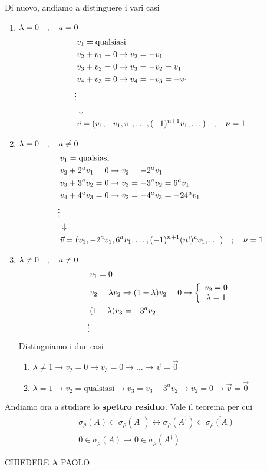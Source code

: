 Di nuovo, andiamo a distinguere i vari casi
\begin{enumerate}
	\item $\lambda = 0 \quad ; \quad a=0$
	\begin{align}
		&v_1 = \text{qualsiasi}\\
		&v_2 + v_1 = 0 \to v_2 = -v_1\\
		&v_3 + v_2 = 0 \to v_3 = -v_2 = v_1\\
		&v_4 + v_3 = 0 \to v_4 = -v_3 = -v_1\\
		\vdots \nonumber \\ &\downarrow \nonumber \\
		&\vec{v} = (v_1, -v_1 , v_1, \dots, (-1)^{n+1}v_1, \dots) \quad ; \quad \nu = 1
	\end{align}
	
	
	
	\item $\lambda = 0 \quad ; \quad a \neq 0$
	\begin{align}
		&v_1 = \text{qualsiasi}\\
		&v_2 + 2^a v_1 = 0 \to v_2 = -2^a v_1 \\
		&v_3 + 3^a v_2 = 0 \to v_3 = -3^a v_2 = 6^a v_1 \\
		&v_4 + 4^a v_3 = 0 \to v_2 = -4^a v_3 = -24^a v_1  \\
		\vdots \nonumber \\ &\downarrow \nonumber \\
		&\vec{v} = (v_1, -2^a v_1 ,6^a v_1, \dots, (-1)^{n+1} (n!)^a v_1, \dots) \quad ; \quad \nu = 1
	\end{align}
	
	
	
	\item $\lambda \neq 0 \quad ; \quad a \neq 0$
	\begin{align}
		&v_1 = 0\\
		&v_2 = \lambda v_2 \to (1 - \lambda)v_2 = 0 \to \left\{ \begin{array}{cc} v_2 = 0\\ \lambda = 1 \end{array} \right.\\
		&(1 - \lambda)v_3 = -3^a v_2\\ 
		\vdots \nonumber
	\end{align}
	Distinguiamo i due casi
	\begin{enumerate}
		\item $\lambda \neq 1 \to v_2 = 0 \to v_3 = 0 \to \dots \to \vec{v} = \vec{0}$
		\item $\lambda = 1 \to v_2 = \text{qualsiasi} \to v_3 = v_3 -3^a v_2 \to v_2 = 0 \to \vec{v} = \vec{0}$
	\end{enumerate}
\end{enumerate}

\newpage

Andiamo ora a studiare lo \textbf{spettro residuo}. Vale il teorema per cui
\begin{align}
	&\sigma_\rho (A) \subset \overline{\sigma_\rho (A^\dagger)} \leftrightarrow \sigma_\rho (A^\dagger) \subset \overline{\sigma_\rho (A)}\\
	&0 \in\sigma_\rho (A) \to 0 \in \overline{\sigma_\rho (A^\dagger)}
\end{align}

CHIEDERE A PAOLO
